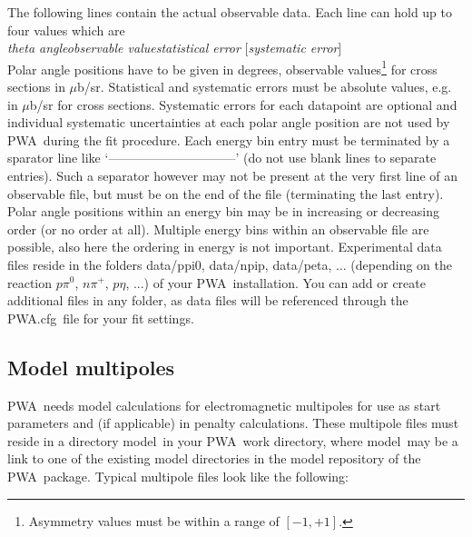 \documentclass[a4paper,10pt]{article}
\def\PWA{\ttfamily PWA\rmfamily\ }
\def\bl{\phantom{0}}
\def\tt{\ttfamily}
\def\rm{\rmfamily}
\begin{document}
The following lines contain the actual observable data. Each line can hold up to four values which are\\
\tt\textit{theta angle\bl\bl\bl\bl observable value\bl\bl\bl\bl  statistical error\bl\bl\bl\bl}
[\textit{systematic error}]\rm\\
Polar angle positions have to be given in degrees, observable values\footnote{Asymmetry values must be within a range
of $[-1,+1]$.} for cross sections in $\mu$b/sr. Statistical and systematic
errors must be absolute values, e.g. in $\mu$b/sr for cross sections.
Systematic errors for each datapoint are optional and individual systematic uncertainties at each polar angle position
are not used by \PWA during the fit procedure.
Each energy bin entry must be terminated by a sparator line like
`\tt------------------------------\rm' (do not use blank lines to separate entries).
Such a separator however may not be present at the very first line of an observable file, but must be on the end of the file
(terminating the last entry).
Polar angle positions within an energy bin may be in increasing or decreasing order (or no order at all).
Multiple energy bins within an observable file are possible, also here the ordering in energy is not important.
Experimental data files reside in the folders \tt data/ppi0\rm, \tt data/npip\rm, 
\tt data/peta\rm, ... (depending on the reaction $p \pi^0$, $n\pi^+$, $p\eta$, ...) of your \PWA installation.
You can add or create additional files in any folder, as data files will be referenced through the 
\tt PWA.cfg\rm\ file for your fit settings.

\subsection{Model multipoles}

\PWA needs model calculations for electromagnetic multipoles for use as start parameters and (if applicable) in penalty calculations.
These multipole files must reside in a directory \tt model\rm\ in your \PWA work directory, where
\tt model\rm\ may be a link to one of the existing model directories in the model repository of the \PWA package.
Typical multipole files look like the following:\\
\end{document}

